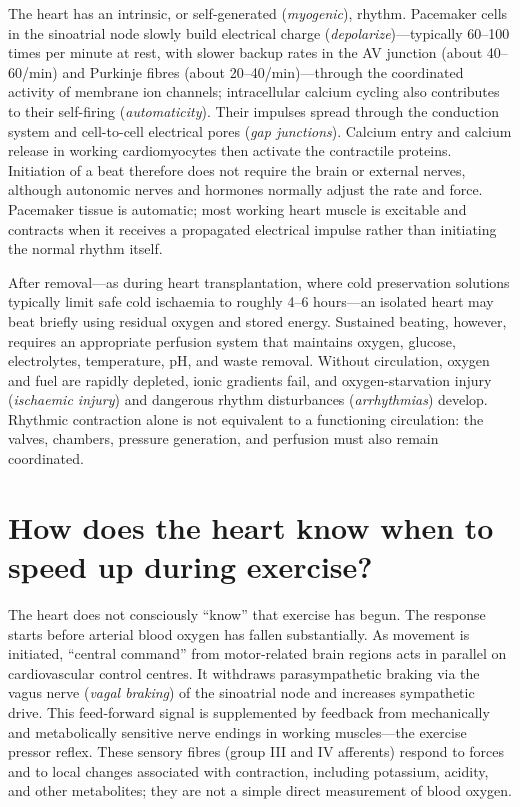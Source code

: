 \documentclass[11pt,oneside]{report}
\begin{document}
The heart has an intrinsic, or self-generated (\emph{myogenic}), rhythm.
Pacemaker cells in the sinoatrial node slowly build electrical charge
(\emph{depolarize})—typically 60--100 times per minute at rest, with slower
backup rates in the AV junction (about 40--60/min) and Purkinje fibres (about
20--40/min)—through the coordinated activity of membrane ion channels;
intracellular calcium cycling also contributes to their self-firing
(\emph{automaticity}). Their impulses spread through the conduction system and
cell-to-cell electrical pores (\emph{gap junctions}). Calcium entry and calcium
release in working cardiomyocytes then activate the contractile proteins.
Initiation of a beat therefore does not require the brain or external nerves,
although autonomic nerves and hormones normally adjust the rate and force.
Pacemaker tissue is automatic; most working heart muscle is excitable and
contracts when it receives a propagated electrical impulse rather than
initiating the normal rhythm itself.

After removal—as during heart transplantation, where cold preservation
solutions typically limit safe cold ischaemia to roughly 4--6 hours—an isolated
heart may beat briefly using residual oxygen and stored energy. Sustained
beating, however, requires an appropriate perfusion system that maintains
oxygen, glucose, electrolytes, temperature, pH, and waste removal. Without
circulation, oxygen and fuel are rapidly depleted, ionic gradients fail, and
oxygen-starvation injury (\emph{ischaemic injury}) and dangerous rhythm
disturbances (\emph{arrhythmias}) develop. Rhythmic
contraction alone is not equivalent to a functioning circulation: the valves,
chambers, pressure generation, and perfusion must also remain coordinated.

\section{How does the heart know when to speed up during exercise?}

The heart does not consciously ``know'' that exercise has begun. The response
starts before arterial blood oxygen has fallen substantially. As movement is
initiated, ``central command'' from motor-related brain regions acts in parallel
on cardiovascular control centres. It withdraws parasympathetic braking via the vagus nerve (\emph{vagal braking})
of the sinoatrial node and increases sympathetic drive. This feed-forward signal
is supplemented by feedback from mechanically and metabolically sensitive
nerve endings in working muscles---the exercise pressor reflex. These sensory
fibres (group III and IV afferents) respond to forces and to local changes
associated with contraction, including potassium, acidity, and other
metabolites; they are not a simple direct measurement of blood oxygen.
\end{document}
